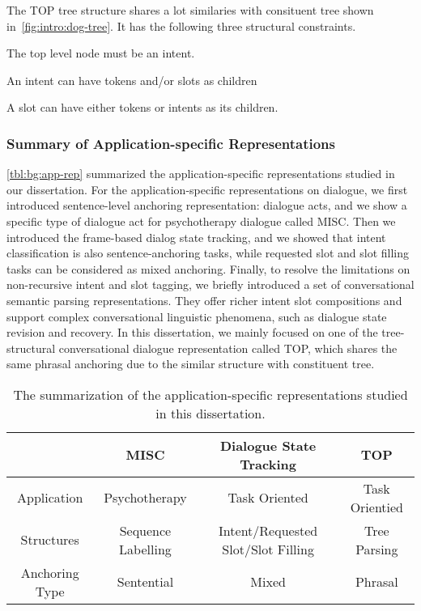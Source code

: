 The TOP tree structure shares a lot similaries with consituent tree
shown in~\autoref{fig:intro:dog-tree}. It has the following three structural
constraints.
\begin{inparaenum}[(1)]
\item The top level node must be an intent.
\item An intent can have tokens and/or slots as children
\item A slot can have either tokens or intents as its children.
\end{inparaenum}

\subsubsection{Summary of Application-specific Representations}
\label{ssec:bg:summary-application-rep}
\autoref{tbl:bg:app-rep} summarized the application-specific
representations studied in our dissertation. For the application-specific
representations on dialogue, we first introduced sentence-level
anchoring representation: dialogue acts, and we show a specific type
of dialogue act for psychotherapy dialogue called MISC. Then we
introduced the frame-based dialog state tracking, and we showed that
intent classification is also sentence-anchoring tasks, while
requested slot and slot filling tasks can be considered as mixed
anchoring. Finally, to resolve the limitations on non-recursive intent
and slot tagging, we briefly introduced a set of conversational
semantic parsing representations. They offer richer intent slot
compositions and support complex conversational linguistic phenomena,
such as dialogue state revision and recovery.  In this dissertation, we
mainly focused on one of the tree-structural conversational dialogue
representation called TOP, which shares the same phrasal anchoring due
to the similar structure with constituent tree.

\begin{table}[ht]
\caption{The summarization of the application-specific representations studied in this dissertation.}
\label{tbl:bg:app-rep}
  \begin{center}
\setlength{\tabcolsep}{4pt}
{\small
\begin{tabular}{c|c|c|c}
  \toprule
  \hline
  & {\bf MISC}               & {\bf Dialogue State Tracking}            & {\bf TOP}            \\ \hline
  Application    & Psychotherapy      & Task Oriented                      & Task Orientied \\
  Structures     & Sequence Labelling & Intent/Requested Slot/Slot Filling & Tree Parsing   \\
  Anchoring Type & Sentential         & Mixed                              & Phrasal        \\
  \hline
  \bottomrule

\end{tabular}}
\end{center}
\label{tbl:bg:app-rep}
\end{table}



